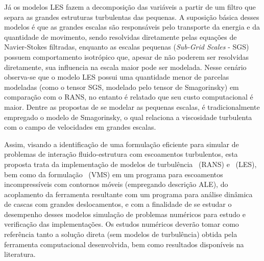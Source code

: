 Já os modelos LES fazem a decomposição das variáveis a partir de um filtro que separa as grandes estruturas turbulentas das pequenas. A suposição básica desses modelos é que as grandes escalas são responsáveis pelo transporte da energia e da quantidade de movimento, sendo resolvidas diretamente pelas equações de Navier-Stokes filtradas, enquanto as escalas pequenas (\textit{Sub-Grid Scales} - SGS) possuem comportamento isotrópico que, apesar de não poderem ser resolvidas diretamente, sua influencia na escala maior pode ser modelada. Nesse cenário observa-se que o modelo LES possui uma quantidade menor de parcelas modeladas (como o tensor SGS, modelado pelo tensor de Smagorinsky) em comparação com o RANS, no entanto é relatado que seu custo computacional é maior. Dentre as propostas de se modelar as pequenas escalas, é tradicionalmente empregado o modelo de Smagorinsky, o qual relaciona a viscosidade turbulenta com o campo de velocidades em grandes escalas.




Assim, visando a identificação de uma formulação eficiente para simular de problemas de interação fluido-estrutura com escoamentos turbulentos, esta proposta trata da implementação de modelos de turbulência \RANS\ (RANS) e \LES\ (LES), bem como da formulação \VMS\ (VMS) em um programa para escoamentos incompressíveis com contornos móveis (empregando descrição ALE), do acoplamento da ferramenta resultante com um programa para análise dinâmica de cascas com grandes deslocamentos, e com a finalidade de se estudar o desempenho desses modelos simulação de problemas numéricos para estudo e verificação das implementações. Os estudos numéricos deverão tomar como referência tanto a solução direta (sem modelos de turbulência) obtida pela ferramenta computacional desenvolvida, bem como resultados disponíveis na literatura.

